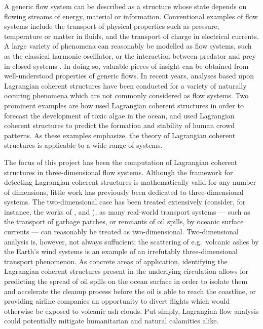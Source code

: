 A generic flow system can be described as a structure whose state depends on
flowing streams of energy, material or information. Conventional examples of
flow systems include the transport of physical properties such as pressure,
temperature or matter in fluids, and the transport of charge in electrical
currents. A large variety of phenomena can reasonably be modelled as flow
systems, such as the classical harmonic oscillator, or the interaction between
predator and prey in closed systems
\parencite[parts I--II]{strogatz2014nonlinear}. In doing so, valuable pieces
of insight can be obtained from well-understood properties of generic flows.
In recent years, analyses based upon Lagrangian coherent structures have been
conducted for a variety of naturally occuring phenomena which are not
commonly considered as flow systems. Two prominent examples are how
\textcite{olascoaga2008tracing} used Lagrangian coherent structures in order
to forecast the development of toxic algae in the ocean, and
\textcite{ali2007lagrangian} used Lagrangian coherent structures to predict
the formation and stability of human crowd patterns. As these examples
emphasize, the theory of Lagrangian coherent structures is applicable to a
wide range of systems.

The focus of this project has been the computation of Lagrangian coherent
structures in three-dimensional flow systems. Although the framework for
detecting Lagrangian coherent structures is mathematically valid for any number
of dimensions, little work has previously been dedicated to three-dimensional
systems. The two-dimensional case has been treated extensively (consider, for
instance, the works of \textcite{haller2000lagrangian},
\textcite{farazmand2012computing} and \textcite{onu2015lcstool}), as many
real-world transport systems --- such as the transport of garbage patches, or
remnants of oil spills, by oceanic surface currents --- can reasonably be
treated as two-dimensional. Two-dimensional analysis is, however, not always
suffucient; the scattering of e.g.\ volcanic ashes by the Earth's wind systems
is an example of an irrefutably three-dimensional transport phenomenon.
As concrete areas of application, identifying the Lagrangian coherent
structures present in the underlying circulation allows for predicting the
spread of oil spills on the ocean surface in order to isolate them and
accelerate the cleanup process before the oil is able to reach the
coastline, or providing airline companies an opportunity to divert flights
which would otherwise be exposed to volcanic ash clouds. Put simply, Lagrangian
flow analysis could potentially mitigate humanitarian and natural calamities
alike.

